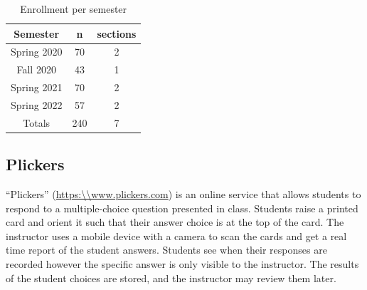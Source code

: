 \documentclass{article}
\begin{document}
\begin{table}[ht]
\caption{Enrollment per semester}
\begin{tabular}{|c|c|c|}
\toprule
Semester    & n  & sections\\ \midrule
\rowcolor{LightGray}
Spring 2020 & 70 & 2 \\ \midrule
Fall 2020   & 43 & 1 \\ \midrule
\rowcolor{LightGray}
Spring 2021 & 70 & 2 \\ \midrule
Spring 2022 & 57 & 2 \\ \midrule
\rowcolor{LightGray}
Totals & 240 & 7 \\ \bottomrule
\end{tabular}
\label{table:enrollmentBySemester}
\end{table}

\subsection{Plickers}
``Plickers'' (\url{https:\\www.plickers.com}) is an online service that allows students to respond to a multiple-choice question presented in class. Students raise a printed card and orient it such that their answer choice is at the top of the card. The instructor uses a mobile device with a camera to scan the cards and get a real time report of the student answers. Students see when their responses are recorded however the specific answer is only visible to the instructor. The results of the student choices are stored, and the instructor may review them later. 
\end{document}
